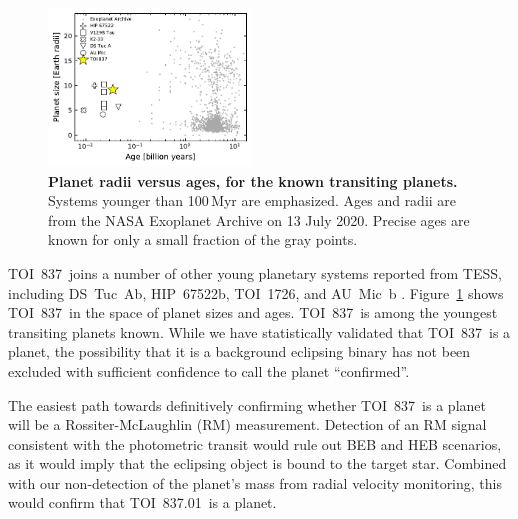 \documentclass[12pt,twocolumn,tighten]{aastex63}
\newcommand{\tn}{TOI~837} %
\newcommand{\pn}{TOI~837.01} %
\begin{document}
\begin{figure}[!t]
	\begin{center}
		\leavevmode
		\includegraphics[width=0.48\textwidth]{f11.pdf}
	\end{center}
	\vspace{-0.7cm}
	\caption{
    {\bf Planet radii versus ages, for the known transiting planets.} 
    Systems younger than 100$\,$Myr are emphasized.  Ages and radii
    are from the NASA Exoplanet Archive on 13 July 2020.
    Precise ages are known for only a small fraction of the gray points.
		\label{fig:rpvsage}
	}
	\vspace{-0.5cm}
\end{figure}



\tn\ joins a number of other young planetary systems reported from
TESS, including DS~Tuc~Ab, HIP~67522b, TOI~1726, and AU~Mic~b
\citep{newton_tess_2019,zhou_well_2019,montet_young_2019,rizzuto_tess_2020,mann_tess_2020,plavchan_planet_2020,palle_transmission_2020,addison_youngest_2020,martioli_magnetism_2020,hirano_limits_2020}.
Figure~\ref{fig:rpvsage} shows \tn\ in the space of planet sizes and ages.
\tn\ is among the youngest transiting planets known.
While we have statistically validated that \tn\ is a planet,
the possibility that it is a background eclipsing binary has not
been excluded with sufficient confidence to call the planet ``confirmed''.

The easiest path towards definitively confirming whether \tn\ is a
planet will be a Rossiter-McLaughlin (RM) measurement.  Detection of
an RM signal consistent with the photometric transit would rule out
BEB and HEB scenarios, as it would imply that the eclipsing object is
bound to the target star. Combined with our non-detection of the
planet's mass from radial velocity monitoring, this would confirm that
\pn\ is a planet.
\end{document}
